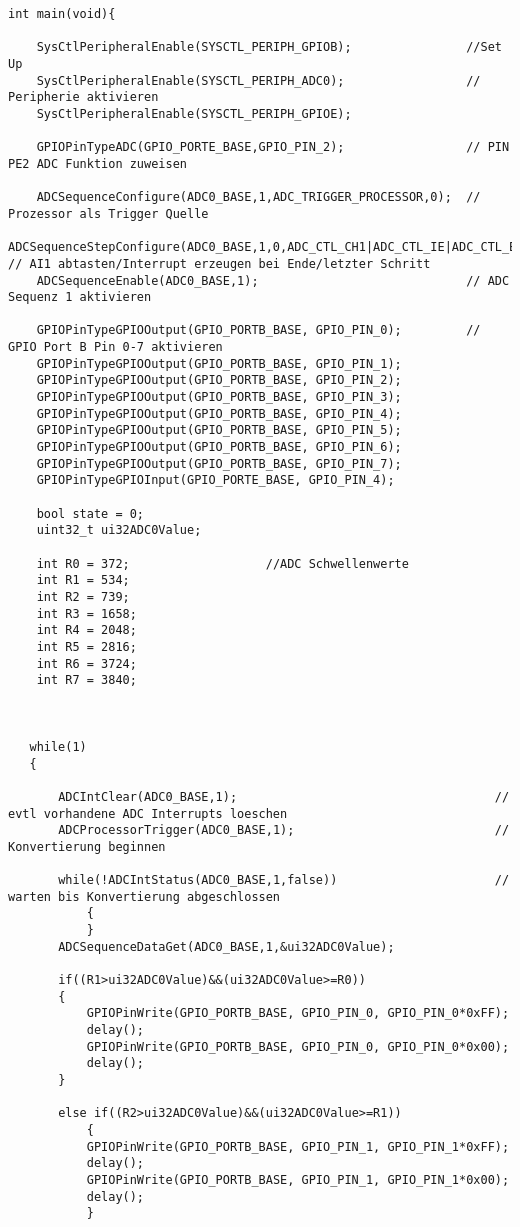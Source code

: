 \begin{lstlisting}
int main(void){

    SysCtlPeripheralEnable(SYSCTL_PERIPH_GPIOB);                //Set Up
    SysCtlPeripheralEnable(SYSCTL_PERIPH_ADC0);                 // Peripherie aktivieren
    SysCtlPeripheralEnable(SYSCTL_PERIPH_GPIOE);

    GPIOPinTypeADC(GPIO_PORTE_BASE,GPIO_PIN_2);                 // PIN PE2 ADC Funktion zuweisen

    ADCSequenceConfigure(ADC0_BASE,1,ADC_TRIGGER_PROCESSOR,0);  // Prozessor als Trigger Quelle
    ADCSequenceStepConfigure(ADC0_BASE,1,0,ADC_CTL_CH1|ADC_CTL_IE|ADC_CTL_END); // AI1 abtasten/Interrupt erzeugen bei Ende/letzter Schritt
    ADCSequenceEnable(ADC0_BASE,1);                             // ADC Sequenz 1 aktivieren

    GPIOPinTypeGPIOOutput(GPIO_PORTB_BASE, GPIO_PIN_0);         // GPIO Port B Pin 0-7 aktivieren
    GPIOPinTypeGPIOOutput(GPIO_PORTB_BASE, GPIO_PIN_1);
    GPIOPinTypeGPIOOutput(GPIO_PORTB_BASE, GPIO_PIN_2);
    GPIOPinTypeGPIOOutput(GPIO_PORTB_BASE, GPIO_PIN_3);
    GPIOPinTypeGPIOOutput(GPIO_PORTB_BASE, GPIO_PIN_4);
    GPIOPinTypeGPIOOutput(GPIO_PORTB_BASE, GPIO_PIN_5);
    GPIOPinTypeGPIOOutput(GPIO_PORTB_BASE, GPIO_PIN_6);
    GPIOPinTypeGPIOOutput(GPIO_PORTB_BASE, GPIO_PIN_7);
    GPIOPinTypeGPIOInput(GPIO_PORTE_BASE, GPIO_PIN_4);

    bool state = 0;
    uint32_t ui32ADC0Value;

    int R0 = 372;                   //ADC Schwellenwerte
    int R1 = 534;
    int R2 = 739;
    int R3 = 1658;
    int R4 = 2048;
    int R5 = 2816;
    int R6 = 3724;
    int R7 = 3840;



   while(1)
   {

       ADCIntClear(ADC0_BASE,1);                                    // evtl vorhandene ADC Interrupts loeschen
       ADCProcessorTrigger(ADC0_BASE,1);                            // Konvertierung beginnen

       while(!ADCIntStatus(ADC0_BASE,1,false))                      // warten bis Konvertierung abgeschlossen
           {
           }
       ADCSequenceDataGet(ADC0_BASE,1,&ui32ADC0Value);

       if((R1>ui32ADC0Value)&&(ui32ADC0Value>=R0))
       {
           GPIOPinWrite(GPIO_PORTB_BASE, GPIO_PIN_0, GPIO_PIN_0*0xFF);
           delay();
           GPIOPinWrite(GPIO_PORTB_BASE, GPIO_PIN_0, GPIO_PIN_0*0x00);
           delay();
       }

       else if((R2>ui32ADC0Value)&&(ui32ADC0Value>=R1))
           {
           GPIOPinWrite(GPIO_PORTB_BASE, GPIO_PIN_1, GPIO_PIN_1*0xFF);
           delay();
           GPIOPinWrite(GPIO_PORTB_BASE, GPIO_PIN_1, GPIO_PIN_1*0x00);
           delay();
           }


\end{lstlisting}
